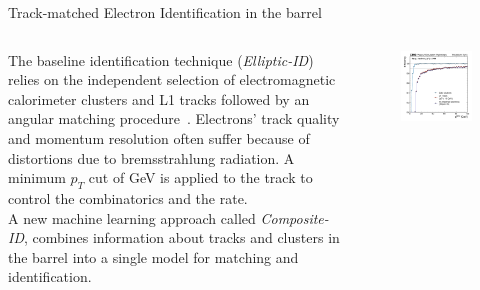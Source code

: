 \documentclass[aspectratio=169]{beamer}\usepackage[utf8]{inputenc}
\begin{document}
\begin{frame}{Track-matched Electron Identification in the barrel}

\begin{columns}[c]

\begin{column}{.7\textwidth}
\begin{minipage}{\textwidth}
The baseline identification technique (\emph{Elliptic-ID}) relies on the independent selection of electromagnetic calorimeter clusters and L1 tracks followed by an angular matching procedure~\cite{tdr-p2-l1}. Electrons' track quality and momentum resolution often suffer because of distortions due to bremsstrahlung radiation. A minimum $p_{T}$ cut of \unit[10]{GeV} is applied to the track to control the combinatorics and the rate.
\\
A new machine learning approach called \emph{Composite-ID}, combines information about tracks and clusters in the barrel into a single model for matching and identification.
\end{minipage}
\end{column}


\begin{column}{.35\textwidth}
\begin{figure}
\centering
    \includegraphics[width=\textwidth]{barrel_figs/slides16/pteff.pdf}
\end{figure}
\end{column}

\end{columns}
\end{frame}
\end{document}

